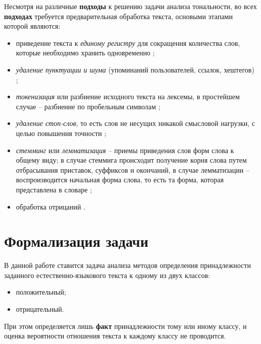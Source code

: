 Несмотря на различные \textbf{подходы} к решению задачи анализа тональности, во
всех \textbf{подходах} требуется предварительная обработка текста, основыми
этапами которой являются:
\begin{itemize}
    \item приведение текста к \textit{единому регистру} для сокращения
        количества слов, которые необходимо хранить одновременно
        \cite{article11};
    \item \textit{удаление пунктуации и шума} (упоминаний пользователей, ссылок,
        хештегов) \cite{article11};
    \item \textit{токенизация} или разбиение исходного текста на лексемы, в простейшем
        случае -- разбиение по пробельным символам \cite{article12};
    \item \textit{удаление стоп-слов}, то есть слов не несущих никакой смысловой
        нагрузки, с целью повышения точности \cite{article11};
    \item \textit{стемминг} или \textit{лемматизация} -- приемы приведения слов
        форм слова к общему виду; в случае стеммига происходит получение корня
        слова путем отбрасывания приставок, суффиксов и окончаний, в случае
        лемматизации -- воспроизводится начальная форма слова, то есть та форма,
        которая представлена в словаре \cite{article11};
    \item обработка отрицаний \cite{article13}.
\end{itemize}

\section{Формализация задачи}

В данной работе ставится задача анализа методов определения принадлежности
заданного естественно-языкового текста к одному из двух классов:
\begin{itemize}
    \item положительный;
    \item отрицательный.
\end{itemize}

При этом определяется лишь \textbf{факт} принадлежности тому или иному
классу, и оценка вероятности отношения текста к каждому классу не проводится.

